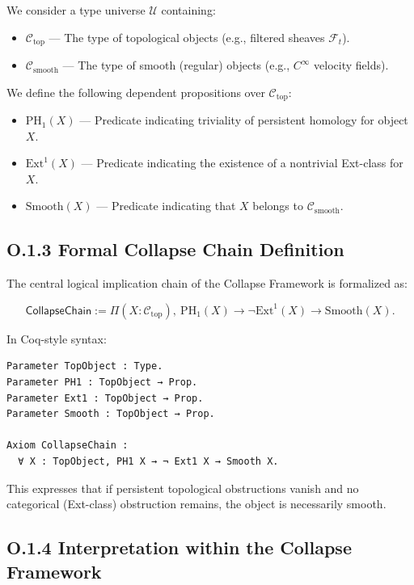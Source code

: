 \documentclass[11pt]{article}
\begin{document}
We consider a type universe \( \mathcal{U} \) containing:

\begin{itemize}
  \item \( \mathcal{C}_{\mathrm{top}} \) — The type of topological objects (e.g., filtered sheaves \( \mathcal{F}_t \)).
  \item \( \mathcal{C}_{\mathrm{smooth}} \) — The type of smooth (regular) objects (e.g., \( C^\infty \) velocity fields).
\end{itemize}

We define the following dependent propositions over \( \mathcal{C}_{\mathrm{top}} \):

\begin{itemize}
  \item \( \mathrm{PH}_1(X) \) — Predicate indicating triviality of persistent homology for object \( X \).
  \item \( \mathrm{Ext}^1(X) \) — Predicate indicating the existence of a nontrivial Ext-class for \( X \).
  \item \( \mathrm{Smooth}(X) \) — Predicate indicating that \( X \) belongs to \( \mathcal{C}_{\mathrm{smooth}} \).
\end{itemize}

\subsection*{O.1.3 Formal Collapse Chain Definition}

The central logical implication chain of the Collapse Framework is formalized as:

\[
\textsf{CollapseChain} :=
\Pi (X : \mathcal{C}_{\mathrm{top}}),\ 
\mathrm{PH}_1(X) \rightarrow \neg \mathrm{Ext}^1(X) \rightarrow \mathrm{Smooth}(X).
\]

In Coq-style syntax:

\begin{lstlisting}[language=Coq]
Parameter TopObject : Type.
Parameter PH1 : TopObject → Prop.
Parameter Ext1 : TopObject → Prop.
Parameter Smooth : TopObject → Prop.

Axiom CollapseChain :
  ∀ X : TopObject, PH1 X → ¬ Ext1 X → Smooth X.
\end{lstlisting}

This expresses that if persistent topological obstructions vanish and no categorical (Ext-class) obstruction remains, the object is necessarily smooth.

\subsection*{O.1.4 Interpretation within the Collapse Framework}
\end{document}
